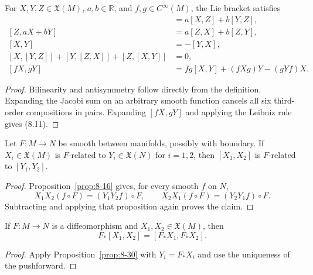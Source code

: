 \begin{proposition}
\label{prop:8-28}
\leanok
{}
For $X,Y,Z\in\mathfrak{X}(M)$, $a,b\in\mathbb{R}$, and
$f,g\in C^\infty(M)$, the Lie bracket satisfies
\begin{align*}
[aX+bY,Z]&=a[X,Z]+b[Y,Z],\\
[Z,aX+bY]&=a[Z,X]+b[Z,Y],\\
[X,Y]&=-[Y,X],\\
[X,[Y,Z]]+[Y,[Z,X]]+[Z,[X,Y]]&=0,\\
[fX,gY]&=fg[X,Y]+(fXg)Y-(gYf)X. \tag{8.11}
\end{align*}
\end{proposition}

\begin{proof}
\leanok
\sketch Bilinearity and antisymmetry follow directly from the definition.
Expanding the Jacobi sum on an arbitrary smooth function cancels all six
third-order compositions in pairs. Expanding $[fX,gY]$ and applying the
Leibniz rule gives (8.11).
\end{proof}


\begin{proposition}
\label{prop:8-30}
\leanok
{}
Let $F\colon M\to N$ be smooth between manifolds, possibly with boundary. If
$X_i\in\mathfrak{X}(M)$ is $F$-related to $Y_i\in\mathfrak{X}(N)$ for
$i=1,2$, then $[X_1,X_2]$ is $F$-related to $[Y_1,Y_2]$.
\end{proposition}

\begin{proof}
\leanok
\sketch Proposition~\ref{prop:8-16} gives, for every smooth $f$ on $N$,
\[
X_1X_2(f\circ F)=(Y_1Y_2f)\circ F,
\qquad
X_2X_1(f\circ F)=(Y_2Y_1f)\circ F.
\]
Subtracting and applying that proposition again proves the claim.
\end{proof}

\begin{corollary}
\label{cor:8-31}
\leanok
{}
If $F\colon M\to N$ is a diffeomorphism and
$X_1,X_2\in\mathfrak{X}(M)$, then
\[
F_*[X_1,X_2]=[F_*X_1,F_*X_2].
\]
\end{corollary}

\begin{proof}
\leanok
\sketch Apply Proposition~\ref{prop:8-30} with $Y_i=F_*X_i$ and use the
uniqueness of the pushforward.
\end{proof}


